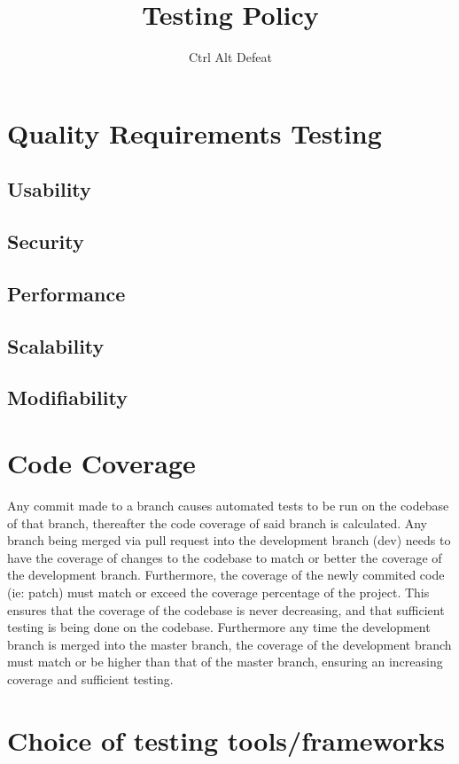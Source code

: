 \documentclass[12pt]{article}
\title{Testing Policy}
\author{Ctrl Alt Defeat}
\begin{document}

\tableofcontents
\newpage

\newpage
\section{Quality Requirements Testing}
\subsection{Usability}
\subsection{Security}
\subsection{Performance}
\subsection{Scalability}
\subsection{Modifiability}

\newpage
\section{Code Coverage}
Any commit made to a branch causes automated tests to be run on the codebase of that branch, thereafter the code coverage of said branch is calculated.
Any branch being merged via pull request into the development branch (dev) needs to have the coverage of changes to the codebase to match or better the coverage of the development branch.
Furthermore, the coverage of the newly commited code (ie: patch) must match or exceed the coverage percentage of the project.
This ensures that the coverage of the codebase is never decreasing, and that sufficient testing is being done on the codebase.
Furthermore any time the development branch is merged into the master branch, the coverage of the development branch must match or be higher than that of the master branch, ensuring an increasing coverage and sufficient testing.

\newpage
\section{Choice of testing tools/frameworks}
\end{document}

